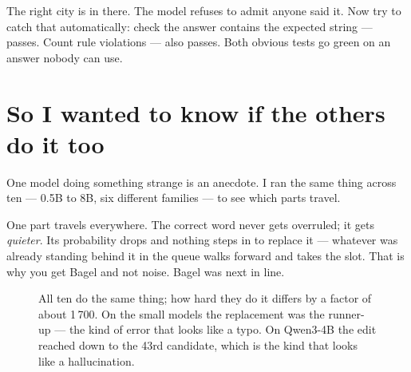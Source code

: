 \documentclass[11pt,a4paper]{article}
\begin{document}
The right city is in there. The model refuses to admit anyone said it. Now try
to catch that automatically: check the answer contains the expected string ---
passes. Count rule violations --- also passes. Both obvious tests go green on an
answer nobody can use.

\section*{So I wanted to know if the others do it too}

One model doing something strange is an anecdote. I ran the same thing across ten
--- 0.5B to 8B, six different families --- to see which parts travel.

One part travels everywhere. The correct word never gets overruled; it gets
\emph{quieter}. Its probability drops and nothing steps in to replace it ---
whatever was already standing behind it in the queue walks forward and takes the
slot. That is why you get Bagel and not noise. Bagel was next in line.

\begin{figure}[h]
\centering
{}
\caption{All ten do the same thing; how hard they do it differs by a factor of
about 1\,700. On the small models the replacement was the runner-up --- the kind
of error that looks like a typo. On Qwen3-4B the edit reached down to the 43rd
candidate, which is the kind that looks like a hallucination.}
\end{figure}
\end{document}
